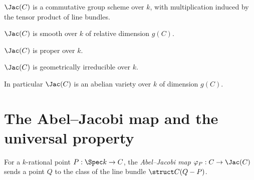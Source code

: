 \begin{proposition}
  \label{prop:jacobian_grpobj}
  \(\Jac(C)\) is a commutative group scheme over \(k\), with multiplication induced by the tensor
  product of line bundles.
\end{proposition}

\begin{theorem}
  \label{thm:jacobian_smooth}
  \(\Jac(C)\) is smooth over \(k\) of relative dimension \(g(C)\).
\end{theorem}

\begin{theorem}
  \label{thm:jacobian_proper}
  \(\Jac(C)\) is proper over \(k\).
\end{theorem}

\begin{theorem}
  \label{thm:jacobian_geomirred}
  \(\Jac(C)\) is geometrically irreducible over \(k\).
\end{theorem}

In particular \(\Jac(C)\) is an abelian variety over \(k\) of dimension \(g(C)\).

\section{The Abel--Jacobi map and the universal property}

\begin{definition}
  \label{def:ofCurve}
  For a \(k\)-rational point \(P : \Spec k \to C\), the \emph{Abel--Jacobi map}
  \(\varphi_P : C \to \Jac(C)\) sends a point \(Q\) to the class of the line bundle
  \(\struct C(Q - P)\).
\end{definition}

